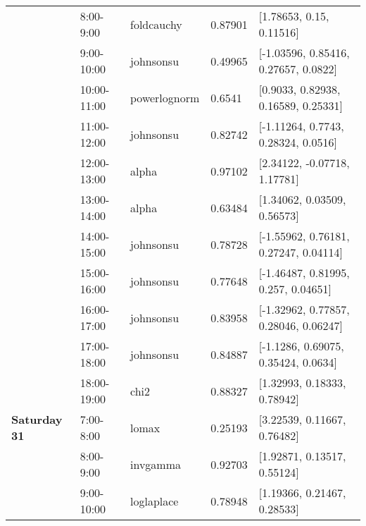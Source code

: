 \begin{longtable}[c]{llllp{5cm}}
\textbf{}             & 8:00-9:00             & foldcauchy            & 0.87901          & {[}1.78653, 0.15, 0.11516{]}                           \\
\textbf{}             & 9:00-10:00             & johnsonsu             & 0.49965          & {[}-1.03596, 0.85416, 0.27657, 0.0822{]}               \\
\textbf{}             & 10:00-11:00            & powerlognorm          & 0.6541           & {[}0.9033, 0.82938, 0.16589, 0.25331{]}                \\
\textbf{}             & 11:00-12:00            & johnsonsu             & 0.82742          & {[}-1.11264, 0.7743, 0.28324, 0.0516{]}                \\
\textbf{}             & 12:00-13:00            & alpha                 & 0.97102          & {[}2.34122, -0.07718, 1.17781{]}                       \\
\textbf{}             & 13:00-14:00            & alpha                 & 0.63484          & {[}1.34062, 0.03509, 0.56573{]}                        \\
\textbf{}             & 14:00-15:00            & johnsonsu             & 0.78728          & {[}-1.55962, 0.76181, 0.27247, 0.04114{]}              \\
\textbf{}             & 15:00-16:00            & johnsonsu             & 0.77648          & {[}-1.46487, 0.81995, 0.257, 0.04651{]}                \\
\textbf{}             & 16:00-17:00            & johnsonsu             & 0.83958          & {[}-1.32962, 0.77857, 0.28046, 0.06247{]}              \\
\textbf{}             & 17:00-18:00            & johnsonsu             & 0.84887          & {[}-1.1286, 0.69075, 0.35424, 0.0634{]}                \\
\textbf{}             & 18:00-19:00            & chi2                  & 0.88327          & {[}1.32993, 0.18333, 0.78942{]}                        \\ \hline
\textbf{Saturday 31}  & 7:00-8:00             & lomax                 & 0.25193          & {[}3.22539, 0.11667, 0.76482{]}                        \\
\textbf{}             & 8:00-9:00             & invgamma              & 0.92703          & {[}1.92871, 0.13517, 0.55124{]}                        \\
\textbf{}             & 9:00-10:00             & loglaplace            & 0.78948          & {[}1.19366, 0.21467, 0.28533{]}                        \\

\end{longtable}
